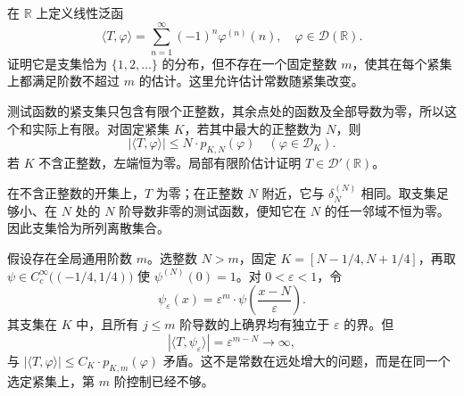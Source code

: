 \begin{optionalexercise}\label{b1:ex:20-locally-finite-unbounded-order}
在 \(\mathbb R\) 上定义线性泛函
\[
 \langle T,\varphi\rangle
 =\sum_{n=1}^\infty(-1)^n\varphi^{(n)}(n),
 \quad \varphi\in\mathcal D(\mathbb R).
\]
证明它是支集恰为 \(\{1,2,\ldots\}\) 的分布，但不存在一个固定整数 \(m\)，使其在每个紧集上都满足阶数不超过 \(m\) 的估计。这里允许估计常数随紧集改变。
\end{optionalexercise}
\begin{solution}
测试函数的紧支集只包含有限个正整数，其余点处的函数及全部导数为零，所以这个和实际上有限。对固定紧集 \(K\)，若其中最大的正整数为 \(N\)，则
\[
 |\langle T,\varphi\rangle|\le N\cdot p_{K,N}(\varphi)
 \quad(\varphi\in\mathcal D_K).
\]
若 \(K\) 不含正整数，左端恒为零。局部有限阶估计证明 \(T\in\mathcal D'(\mathbb R)\)。

在不含正整数的开集上，\(T\) 为零；在正整数 \(N\) 附近，它与 \(\delta_N^{(N)}\) 相同。取支集足够小、在 \(N\) 处的 \(N\) 阶导数非零的测试函数，便知它在 \(N\) 的任一邻域不恒为零。因此支集恰为所列离散集合。

假设存在全局通用阶数 \(m\)。选整数 \(N>m\)，固定 \(K=[N-1/4,N+1/4]\)，再取 \(\psi\in C_c^\infty\bigl((-1/4,1/4)\bigr)\) 使 \(\psi^{(N)}(0)=1\)。对 \(0<\varepsilon<1\)，令
\[
 \psi_\varepsilon(x)=\varepsilon^m\cdot \psi\left(\frac{x-N}{\varepsilon}\right).
\]
其支集在 \(K\) 中，且所有 \(j\le m\) 阶导数的上确界均有独立于 \(\varepsilon\) 的界。但
\[
 |\langle T,\psi_\varepsilon\rangle|=\varepsilon^{m-N}\longrightarrow\infty,
\]
与 \(|\langle T,\varphi\rangle|\le C_K\cdot p_{K,m}(\varphi)\) 矛盾。这不是常数在远处增大的问题，而是在同一个选定紧集上，第 \(m\) 阶控制已经不够。
\end{solution}

